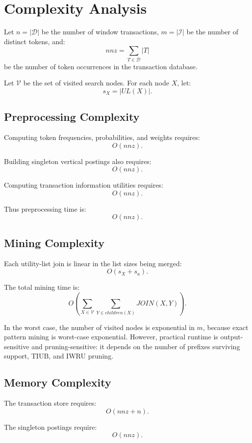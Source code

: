 \documentclass[11pt,a4paper]{article}
\newcommand{\D}{\mathcal{D}}
\newcommand{\I}{\mathcal{I}}
\newcommand{\Visited}{\mathcal{V}}
\begin{document}
\section{Complexity Analysis}

Let \(n=|\D|\) be the number of window transactions, \(m=|\I|\) be the number of distinct tokens, and:
\[
nnz=\sum_{T\in\D}|T|
\]
be the number of token occurrences in the transaction database.

Let \(\Visited\) be the set of visited search nodes. For each node \(X\), let:
\[
s_X=|UL(X)|.
\]

\subsection{Preprocessing Complexity}

Computing token frequencies, probabilities, and weights requires:
\[
O(nnz).
\]

Building singleton vertical postings also requires:
\[
O(nnz).
\]

Computing transaction information utilities requires:
\[
O(nnz).
\]

Thus preprocessing time is:
\[
O(nnz).
\]

\subsection{Mining Complexity}

Each utility-list join is linear in the list sizes being merged:
\[
O(s_X+s_a).
\]

The total mining time is:
\[
O\left(
\sum_{X\in\Visited}
\sum_{Y\in children(X)}
JOIN(X,Y)
\right).
\]

In the worst case, the number of visited nodes is exponential in \(m\), because exact pattern mining is worst-case exponential. However, practical runtime is output-sensitive and pruning-sensitive: it depends on the number of prefixes surviving support, TIUB, and IWRU pruning.

\subsection{Memory Complexity}

The transaction store requires:
\[
O(nnz+n).
\]

The singleton postings require:
\[
O(nnz).
\]
\end{document}
